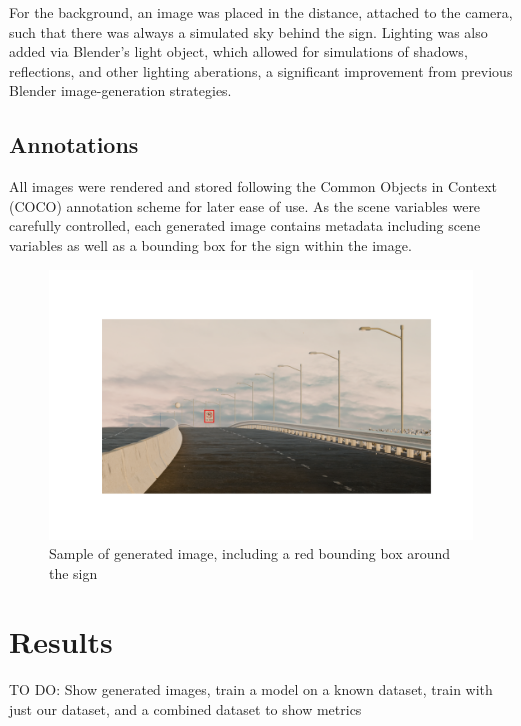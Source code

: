\documentclass[journal]{IEEEtran}
\begin{document}
For the background, an image was placed in the distance, attached to the camera, such that there was always a simulated sky behind the sign. Lighting was also added via Blender's light object, which allowed for simulations of shadows, reflections, and other lighting aberations, a significant improvement from previous Blender image-generation strategies\cite{blender_paper}. 

\subsection{Annotations}
All images were rendered and stored following the Common Objects in Context (COCO) annotation scheme for later ease of use. As the scene variables were carefully controlled, each generated image contains metadata including scene variables as well as a bounding box for the sign within the image. 

\begin{figure}[ht]
    \centering
    \includegraphics[width=\linewidth]{images/sign w box.png}
    \caption{Sample of generated image, including a red bounding box around the sign}
    \label{fig:row_of_images}
\end{figure}





\section{Results}
TO DO: Show generated images, train a model on a known dataset, train with just our dataset, and a combined dataset to show metrics
\end{document}
